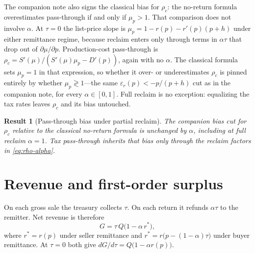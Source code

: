 \documentclass[11pt]{article}
\newtheorem{result}{Result}
\begin{document}
The companion note also signs the classical bias for $\rho_c$: the no-return
formula overestimates pass-through if and only if $\mu_p>1$.  That comparison
does not involve $\alpha$.  At $\tau=0$ the list-price slope is
$\mu_p=1-r(p)-r'(p)(p+h)$ under either remittance regime, because reclaim
enters only through terms in $\alpha\tau$ that drop out of
$\partial\mu/\partial p$.  Production-cost pass-through is
$\rho_c=S'(\mu)/(S'(\mu)\mu_p-D'(p))$, again with no $\alpha$.  The classical
formula sets $\mu_p=1$ in that expression, so whether it over- or
underestimates $\rho_c$ is pinned entirely by whether $\mu_p\gtrless 1$---the
same $\varepsilon_r(p)<-p/(p+h)$ cut as in the companion note, for every
$\alpha\in[0,1]$.  Full reclaim is no exception: equalizing the tax rates
leaves $\rho_c$ and its bias untouched.
\begin{result}[Pass-through bias under partial reclaim]
\label{res:pt-bias-alpha}
  The companion bias cut for $\rho_c$ relative to the classical no-return
  formula is unchanged by $\alpha$, including at full reclaim $\alpha=1$.
  Tax pass-through inherits that bias only through the reclaim factors in
  \eqref{eq:rho-alpha}.
\end{result}

\section{Revenue and first-order surplus}

On each gross sale the treasury collects $\tau$.  On each return it refunds
$\alpha\tau$ to the remitter.  Net revenue is therefore
\begin{equation}
  G
  = \tau\,Q\bigl(1-\alpha\,r^{\ast}\bigr),
  \label{eq:G-alpha}
\end{equation}
where $r^{\ast}=r(p)$ under seller remittance and
$r^{\ast}=r\bigl(p-(1-\alpha)\tau\bigr)$ under buyer remittance.  At
$\tau=0$ both give $dG/d\tau=Q\bigl(1-\alpha r(p)\bigr)$.
\end{document}
